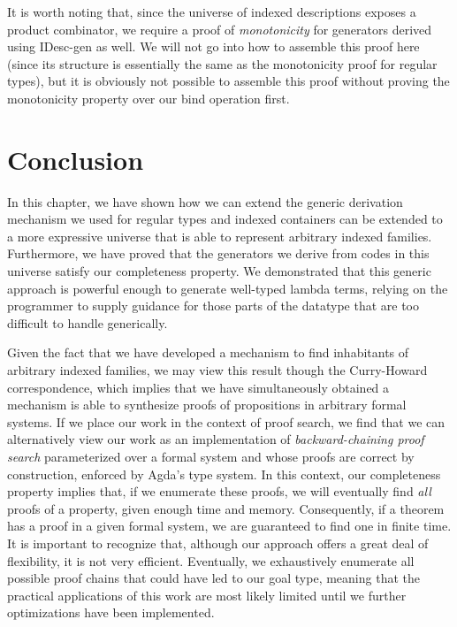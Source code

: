 \documentclass[a4paper,msc,twosized=semi]{uustthesis}
\let\oldemph\emph
\renewcommand\emph[1]{{\large\oldemph{#1}}}
\newcommand{\agda}[1]{{\agdafontinline\color{agdacolor}#1}}
\begin{document}
  It is worth noting that, since the universe of indexed descriptions exposes a 
  product combinator, we require a proof of \emph{monotonicity} for generators derived 
  using \agda{IDesc-gen} as well. We will not go into how to assemble this proof here 
  (since its structure is essentially the same as the monotonicity proof for regular 
  types), but it is obviously not possible to assemble this proof without proving the 
  monotonicity property over our bind operation first. 

\section*{Conclusion}

  In this chapter, we have shown how we can extend the generic derivation mechanism we 
  used for regular types and indexed containers can be extended to a more expressive 
  universe that is able to represent arbitrary indexed families. Furthermore, we have 
  proved that the generators we derive from codes in this universe satisfy our 
  completeness property. We demonstrated that this generic approach is powerful enough 
  to generate well-typed lambda terms, relying on the programmer to supply guidance 
  for those parts of the datatype that are too difficult to handle generically. 

  Given the fact that we have developed a mechanism to find inhabitants of arbitrary 
  indexed families, we may view this result though the Curry-Howard correspondence, 
  which implies that we have simultaneously obtained a mechanism is able to synthesize 
  proofs of propositions in arbitrary formal systems. If we place our work in the 
  context of proof search, we find that we can alternatively view our work as an 
  implementation of \emph{backward-chaining proof search} \cite{miller1991uniform} 
  parameterized over a formal system and whose proofs are correct by construction, 
  enforced by Agda's type system. In this context, our completeness property implies 
  that, if we enumerate these proofs, we will eventually find \emph{all} proofs of a 
  property, given enough time and memory. Consequently, if a theorem has a proof in a 
  given formal system, we are guaranteed to find one in finite time. It is important 
  to recognize that, although our approach offers a great deal of flexibility, it is 
  not very efficient. Eventually, we exhaustively enumerate all possible proof chains 
  that could have led to our goal type, meaning that the practical applications of 
  this work are most likely limited until we further optimizations have been 
  implemented. 
\end{document}
